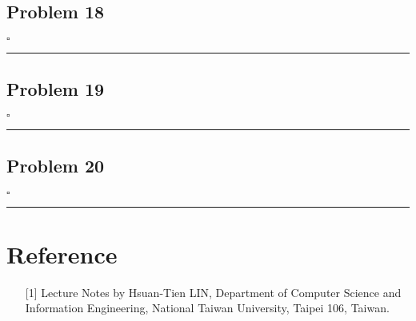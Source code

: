 \documentclass[12pt]{article}
\newcommand*{\QEDB}{\hfill\ensuremath{\square}}
\newcommand{\horrule}[1]{\rule{\linewidth}{#1}}
\begin{document}
\subsection*{Problem 18}

\QEDB

\horrule{0.5pt}

\subsection*{Problem 19}

\QEDB

\horrule{0.5pt}

\subsection*{Problem 20}

\QEDB

\horrule{0.5pt}

\section*{Reference}

\begin{enumerate}

\item[{[1]}] Lecture Notes by Hsuan-Tien LIN, Department of Computer Science and Information Engineering, National Taiwan University, Taipei 106, Taiwan.


\end{enumerate}
\end{document}
